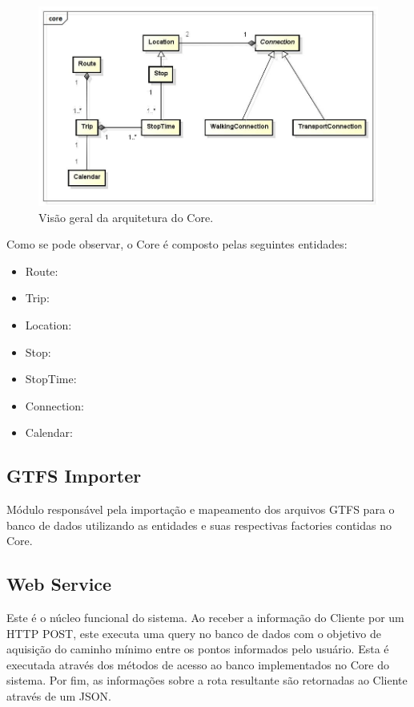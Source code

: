 \begin{figure}[!htb]
	\centering
	\includegraphics[width=1\textwidth]{./CoreDiagram.jpg}
	\caption[ImgCore]{Visão geral da arquitetura do Core.}
	\label{fig:core}
\end{figure}

Como se pode observar, o Core é composto pelas seguintes entidades:

\begin{itemize}
	\item Route:
	\item Trip:
	\item Location:
	\item Stop:
	\item StopTime:
	\item Connection:
	\item Calendar:
\end{itemize}



\subsection{GTFS Importer}
Módulo responsável pela importação e mapeamento dos arquivos GTFS para o banco de dados utilizando as entidades e suas respectivas factories contidas no Core. 

\subsection{Web Service}
Este é o núcleo funcional do sistema.
Ao receber a informação do Cliente por um HTTP POST, este executa uma query no banco de dados com o objetivo de aquisição do caminho mínimo entre os pontos informados pelo usuário. 
Esta é executada através dos métodos de acesso ao banco implementados no Core do sistema. 
Por fim, as informações sobre a rota resultante são retornadas ao Cliente através de um JSON.

